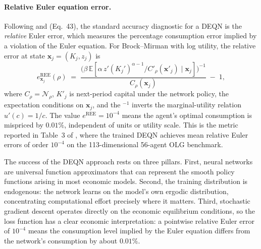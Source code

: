 \documentclass[11pt,a4paper]{report}
\newcommand{\x}{\bm{x}}
\begin{document}
\paragraph{Relative Euler equation error.}  Following \citet{judd1998numerical} and \citet{azinovicDEEPEQUILIBRIUMNETS2022} (Eq.~43), the standard accuracy diagnostic for a DEQN is the \emph{relative} Euler error, which measures the percentage consumption error implied by a violation of the Euler equation.  For Brock--Mirman with log utility, the relative error at state $\x_j = (K_j, z_j)$ is
\begin{equation}
e^{\mathrm{REE}}_{\x_j}(\rho)
\;=\;
\frac{
  \bigl(\beta\,\mathbb{E}[\alpha\, z' (K_j')^{\alpha-1}/C'_\rho(\x'_j)\mid \x_j]\bigr)^{-1}
}{C_\rho(\x_j)}
\;-\; 1,
\label{eq:ree_bm}
\end{equation}
where $C_\rho = \mathcal{N}_\rho$, $K'_j$ is next-period capital under the network policy, the expectation conditions on $\x_j$, and the $^{-1}$ inverts the marginal-utility relation $u'(c) = 1/c$.  The value $e^{\mathrm{REE}} = 10^{-4}$ means the agent's optimal consumption is mispriced by $0.01\%$, independent of units or utility scale.  This is the metric reported in Table~3 of \citet{azinovicDEEPEQUILIBRIUMNETS2022}, where the trained DEQN achieves mean relative Euler errors of order $10^{-4}$ on the 113-dimensional 56-agent OLG benchmark.

\begin{remarkbox}
The success of the DEQN approach rests on three pillars.  First, neural networks are universal function approximators that can represent the smooth policy functions arising in most economic models.  Second, the training distribution is endogenous: the network learns on the model's own ergodic distribution, concentrating computational effort precisely where it matters.  Third, stochastic gradient descent operates directly on the economic equilibrium conditions, so the loss function has a clear economic interpretation: a pointwise relative Euler error of $10^{-4}$ means the consumption level implied by the Euler equation differs from the network's consumption by about $0.01\%$.
\end{remarkbox}
\end{document}
